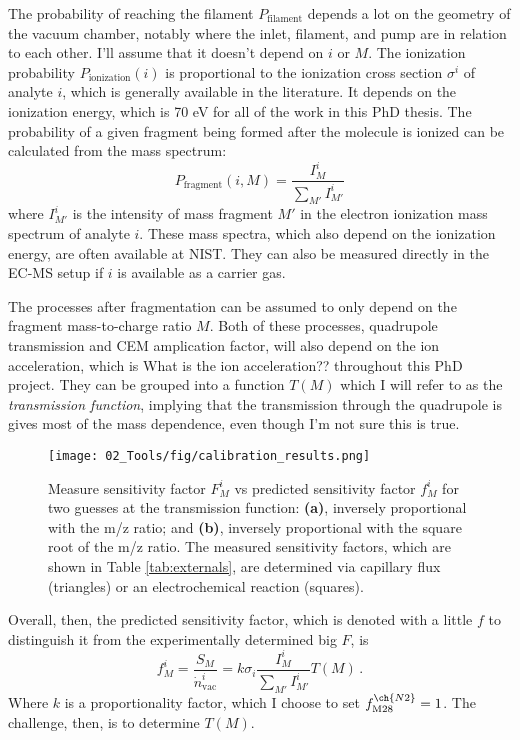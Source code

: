The probability of reaching the filament $P_\text{filament}$ depends a lot on the geometry of the vacuum chamber, notably where the inlet, filament, and pump are in relation to each other. I'll assume that it doesn't depend on $i$ or $M$. The ionization probability $P_\text{ionization}(i)$ is proportional to the ionization cross section $\sigma^i$ of analyte $i$, which is generally available in the literature. It depends on the ionization energy, which is 70 eV for all of the work in this PhD thesis. The probability of a given fragment being formed after the molecule is ionized can be calculated from the mass spectrum:
\begin{equation}
P_\text{fragment}(i, M) = \frac{I_M^i}{\sum_{M'}I_{M'}^i}
\end{equation}
where $I_{M'}^i$ is the intensity of mass fragment $M'$ in the electron ionization mass spectrum of analyte $i$. These mass spectra, which also depend on the ionization energy, are often available at NIST\cite{NIST}. They can also be measured directly in the EC-MS setup if $i$ is available as a carrier gas. 

The processes after fragmentation can be assumed to only depend on the fragment mass-to-charge ratio $M$. Both of these processes, quadrupole transmission and CEM amplication factor, will also depend on the ion acceleration, which is \todo What is the ion acceleration??  throughout this PhD project. They can be grouped into a function $T(M)$ which I will refer to as the \textit{transmission function}, implying that the transmission through the quadrupole is gives most of the mass dependence, even though I'm not sure this is true.

\begin{figure}[h!]
	\texttt{[image: 02\_Tools/fig/calibration\_results.png]}
	\caption{Measure sensitivity factor $F_M^i$ vs predicted sensitivity factor $f_M^i$ for two guesses at the transmission function: \textbf{(a)}, inversely proportional with the m/z ratio; and \textbf{(b)}, inversely proportional with the square root of the m/z ratio. The measured sensitivity factors, which are shown in Table \ref{tab:externals}, are determined via capillary flux (triangles) or an electrochemical reaction (squares). }
	\label{fig:transmission}
\end{figure}

Overall, then, the predicted sensitivity factor, which is denoted with a little $f$ to distinguish it from the experimentally determined big $F$, is
\begin{equation}
f_M^i = \frac{S_M}{\dot{n}^i_\text{vac}} = k \sigma_i \frac{I_M^i}{\sum_{M'}I_{M'}^i} T(M)\,.\label{eq:rsf}
\end{equation} 
Where $k$ is a proportionality factor, which I choose to set $f_{\text{M28}}^{\ch{N2}} = 1$. The challenge, then, is to determine $T(M)$.

